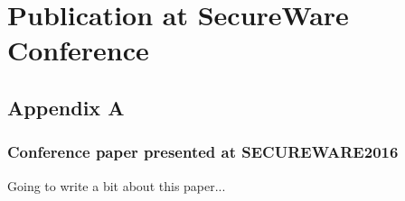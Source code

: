 \chapter{Publication at SecureWare Conference} 
\section{Appendix A}
\subsection{Conference paper presented at SECUREWARE2016}
Going to write a bit about this paper...


% 
% 